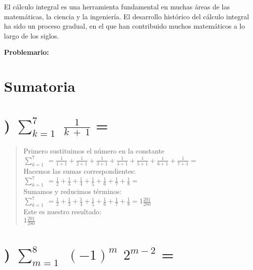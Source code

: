 \documentclass[12pt]{article}
\begin{document}
El cálculo integral es una herramienta fundamental en muchas áreas de las matemáticas, la ciencia y la ingeniería. El desarrollo histórico del cálculo integral ha sido un proceso gradual, en el que han contribuido muchos matemáticos a lo largo de los siglos.

\newpage

\fontsize{17}{100}\selectfont
\textbf{Problemario:}

\section*{Sumatoria}\label{sec:sumatoria}

\fontsize{15}{40}\selectfont
\section*{) $\sum_{k = 1}^{7}$ \fontsize{20}{40}\selectfont $\frac{1}{k\ +\ 1}$ =} \label{sumatoria:problema_1}

\begin{quote}
  \fontsize{15}{25}\selectfont
  Primero sustituimos el número en la constante\\
  $\sum _{k=1}^7\:= \frac{1}{1+1} + \frac{1}{2+1} + \frac{1}{3+1} + \frac{1}{4+1} + \frac{1}{5+1} + \frac{1}{6+1} + \frac{1}{7+1} = $\\
  Hacemos las sumas correspondientes:\\
  $\sum _{k=1}^7\:= \frac{1}{2} + \frac{1}{3} + \frac{1}{4} + \frac{1}{5} + \frac{1}{6} + \frac{1}{7} + \frac{1}{8} = $\\
  Sumamos y reducimos términos:\\
  $\sum _{k=1}^7\:= \frac{1}{2} + \frac{1}{3} + \frac{1}{4} + \frac{1}{5} + \frac{1}{6} + \frac{1}{7} + \frac{1}{8} = 1 \frac{201}{280} $\\
  Este es nuestro resultado:\\
  $ 1 \frac{201}{280}$
\end{quote}

\fontsize{15}{40}\selectfont
\section*{) $\sum_{m = 1}^{8}$ $(-1)^m$ $2^{m-2}$ =} \label{sumatoria:problema_2}
\end{document}
